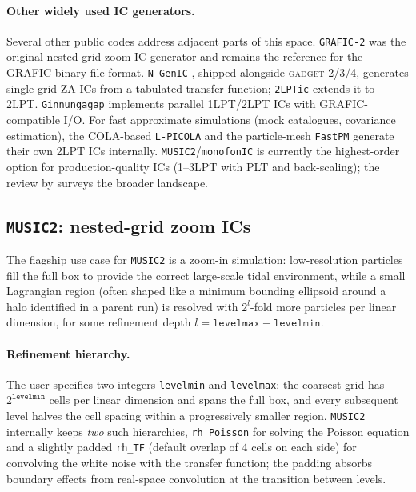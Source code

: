 \documentclass[12pt]{article}
\begin{document}
\paragraph{Other widely used IC generators.}  Several other public
codes address adjacent parts of this space.  \texttt{GRAFIC-2}
\citep{Bertschinger2001} was the original nested-grid zoom IC
generator and remains the reference for the GRAFIC binary file
format.  \texttt{N-GenIC} \citep{Springel2005}, shipped alongside
\textsc{gadget}-2/3/4, generates single-grid ZA ICs from a tabulated
transfer function; \texttt{2LPTic} \citep{Crocce2006} extends it to
2LPT.  \texttt{Ginnungagap} \citep{Prunet2008} implements parallel
1LPT/2LPT ICs with GRAFIC-compatible I/O.  For fast approximate
simulations (mock catalogues, covariance estimation), the COLA-based
\texttt{L-PICOLA} \citep{Howlett2015} and the particle-mesh
\texttt{FastPM} \citep{Feng2016} generate their own 2LPT ICs
internally.  \texttt{MUSIC2}/\texttt{monofonIC} is currently the
highest-order option for production-quality ICs (1--3LPT with PLT
and back-scaling); the review by \citet{Angulo2022} surveys the
broader landscape.

\subsection{\texttt{MUSIC2}: nested-grid zoom ICs}
\label{sec:music2}

The flagship use case for \texttt{MUSIC2} is a zoom-in simulation:
low-resolution particles fill the full box to provide the correct
large-scale tidal environment, while a small Lagrangian region
(often shaped like a minimum bounding ellipsoid around a halo
identified in a parent run) is resolved with $2^l$-fold more particles
per linear dimension, for some refinement depth
$l \!=\! \texttt{levelmax}\!-\!\texttt{levelmin}$.

\paragraph{Refinement hierarchy.}  The user specifies two integers
\texttt{levelmin} and \texttt{levelmax}: the coarsest grid has
$2^{\texttt{levelmin}}$ cells per linear dimension and spans the full
box, and every subsequent level halves the cell spacing within a
progressively smaller region.  \texttt{MUSIC2} internally keeps
\emph{two} such hierarchies, \texttt{rh\_Poisson} for solving the
Poisson equation and a slightly padded \texttt{rh\_TF} (default
overlap of 4 cells on each side) for convolving the white noise with
the transfer function; the padding absorbs boundary effects from
real-space convolution at the transition between levels.
\end{document}
